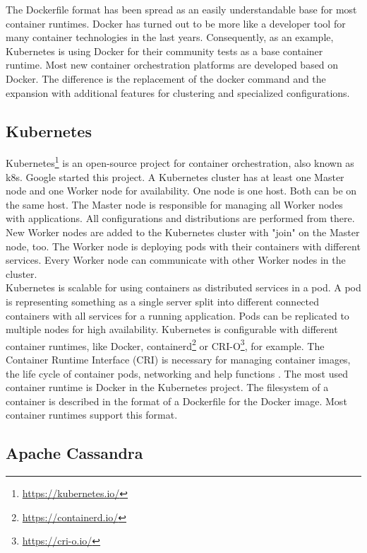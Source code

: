 The Dockerfile format has been spread as an easily understandable base for most container runtimes. 
Docker has turned out to be more like a developer tool for many container technologies in the last years. 
Consequently, as an example, Kubernetes is using Docker for their community tests as a base container runtime.
Most new container orchestration platforms are developed based on Docker. The difference is the replacement of the docker command and the expansion with additional features for clustering and specialized configurations.

\subsection{Kubernetes}\label{Kubernetes-Intro}

Kubernetes\footnote{\url{https://kubernetes.io/}} is an open-source project for container orchestration, also known as k8s. Google started this project. A Kubernetes cluster has at least one Master node and one Worker node for availability. One node is one host. Both can be on the same host. The Master node is responsible for managing all Worker nodes with applications. All configurations and distributions are performed from there. New Worker nodes are added to the Kubernetes cluster with "join" on the Master node, too. The Worker node is deploying pods with their containers with different services. Every Worker node can communicate with other Worker nodes in the cluster. \\
Kubernetes is scalable for using containers as distributed services in a pod. A pod is representing something as a single server split into different connected containers with all services for a running application. Pods can be replicated to multiple nodes for high availability. Kubernetes is configurable with different container runtimes, like Docker, containerd\footnote{\url{https://containerd.io/}} or CRI-O\footnote{\url{https://cri-o.io/}}, for example. The Container Runtime Interface (CRI) is necessary for managing container images, the life cycle of container pods, networking and help functions \cite[~p.16]{Scholl2019}. The most used container runtime is Docker in the Kubernetes project. The filesystem of a container is described in the format of a Dockerfile for the Docker image. Most container runtimes support this format.


\subsection{Apache Cassandra}\label{Cassandra-Intro}

